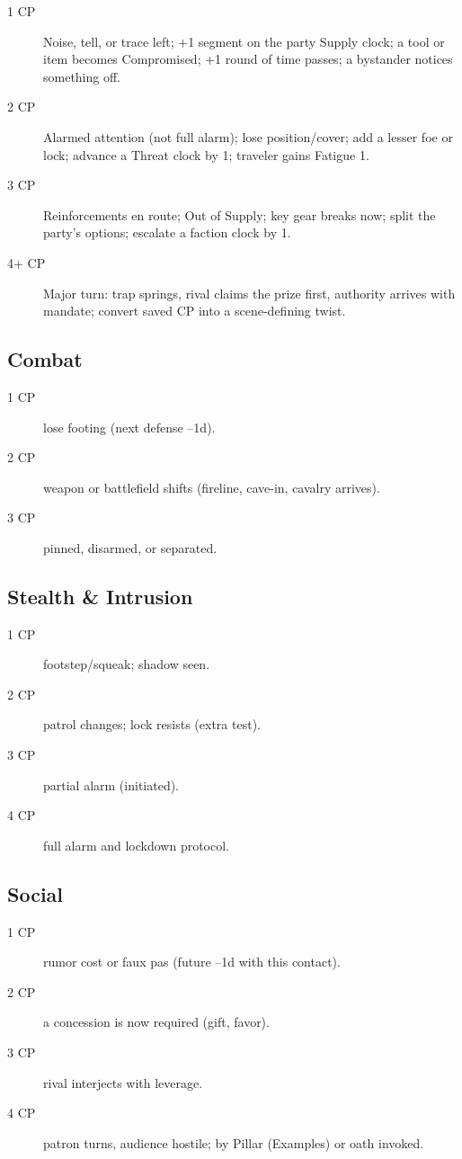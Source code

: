 \begin{description}
\item[1 CP] Noise, tell, or trace left; +1 segment on the party Supply clock; a tool or item becomes Compromised; +1 round of time passes; a bystander notices something off.
\item[2 CP] Alarmed attention (not full alarm); lose position/cover; add a lesser foe or lock; advance a Threat clock by 1; traveler gains Fatigue 1.
\item[3 CP] Reinforcements en route; Out of Supply; key gear breaks now; split the party's options; escalate a faction clock by 1.
\item[4+ CP] Major turn: trap springs, rival claims the prize first, authority arrives with mandate; convert saved CP into a scene-defining twist.
\end{description}

\subsection{Combat}

\begin{description}
\item[1 CP] lose footing (next defense --1d).
\item[2 CP] weapon or battlefield shifts (fireline, cave-in, cavalry arrives).
\item[3 CP] pinned, disarmed, or separated.
\end{description}

\subsection{Stealth \& Intrusion}

\begin{description}
\item[1 CP] footstep/squeak; shadow seen.
\item[2 CP] patrol changes; lock resists (extra test).
\item[3 CP] partial alarm (initiated).
\item[4 CP] full alarm and lockdown protocol.
\end{description}

\subsection{Social}

\begin{description}
\item[1 CP] rumor cost or faux pas (future --1d with this contact).
\item[2 CP] a concession is now required (gift, favor).
\item[3 CP] rival interjects with leverage.
\item[4 CP] patron turns, audience hostile; by Pillar (Examples) or oath invoked.
\end{description}

